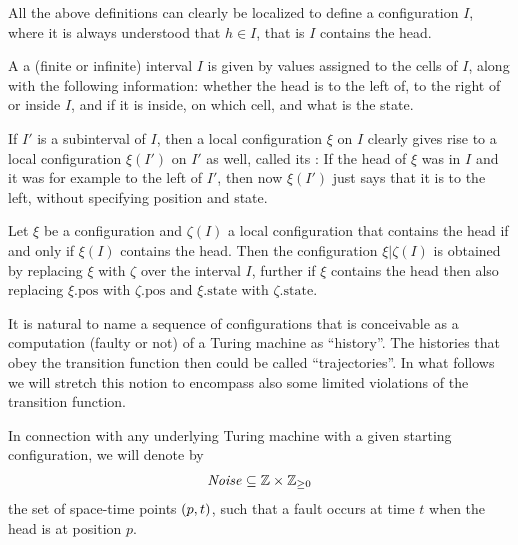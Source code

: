 \documentclass[12pt]{memoir}
\renewcommand{\ge}{\geq}
\newcommand{\h}{h}
\newcommand{\Noise}{\mathit{Noise}}
\newcommand{\pos}{\mathrm{pos}}
\newcommand{\state}{\mathrm{state}}
\begin{document}
All the above definitions can clearly be localized to define a configuration
 \( I \), where it is always understood that \( \h\in I \), that is 
\( I \) contains the head.

\begin{definition}
\label{def:local-config}
  A  a (finite or infinite)
  interval \( I \) is given by values assigned to the cells
  of \( I \), along with the following information: whether
  the head is to the left of, to the right of or inside
  \( I \), and if it is inside, on which cell, and what is
  the state.

  If \( I' \) is a subinterval of \( I \), then a local configuration
  \( \xi \) on \( I \) clearly gives rise to a local configuration
  \( \xi(I') \) on \( I' \) as well, called its
  : If the head of \( \xi \) was in \( I \)
  and it was for example to the left of \( I' \), then now
  \( \xi(I') \) just says that it is to the left, without
  specifying position and state.

  Let \( \xi \) be a configuration and \( \zeta(I) \) a local
  configuration that contains the head if and only if
  \( \xi(I) \) contains the head.
  Then the configuration \( \xi\vert\zeta(I) \) is obtained by
  replacing \( \xi \) with \( \zeta \) over the interval \( I \),
  further if \( \xi \) contains the head then also replacing
  \( \xi.\pos \) with \( \zeta.\pos \) and \( \xi.\state \) with
  \( \zeta.\state \).
\end{definition}

It is natural to name a sequence of configurations that is conceivable as a computation
(faulty or not) of a Turing machine as ``history''.
The histories that obey the transition function then could be called ``trajectories''.
In what follows we will 
stretch this notion to encompass also some limited violations of the
transition function.

In connection with any underlying Turing machine with a given starting configuration, we will
denote by
\begin{align}\label{eq:noise-first}
   \Noise\subseteq \bbZ\times \bbZ_{\ge 0}
\end{align}
the set of space-time points \( (p,t) \), such that
a fault occurs at time \( t \) when the head is at position \( p \).
\end{document}
